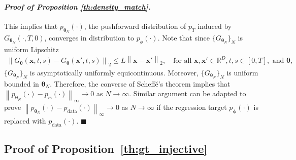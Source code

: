 \documentclass{article} \usepackage{iclr2024_coNFErence,times}
\newcommand{\norm}[1]{\left\lVert#1\right\rVert}
\newenvironment{myproof}[2]{\paragraph{\textit{Proof of {#1} {#2}. }}}{\hfill$\blacksquare$}
\theoremstyle{definition}
\theoremstyle{remark}
\begin{document}
\begin{myproof}{Proposition}{\ref{th:density_match}}
    This implies that $p_{\bm{\theta}_N}(\cdot)$, the pushforward distribution of $p_T$ induced by $G_{\bm{\theta}_N}(\cdot, T, 0)$, converges in distribution to $p_{\phi}(\cdot)$. Note that since $\{G_{\bm{\theta}_N} \}_{N}$ is uniform Lipschitz
    \begin{align*}
        \norm{G_{\bm{\theta}}(\mathbf{x}, t, s) - G_{\bm{\theta}}(\mathbf{x}', t, s)}_2 \leq L \norm{\mathbf{x} - \mathbf{x}'}_2, \quad \text{for all } \mathbf{x}, \mathbf{x}'\in \mathbb{R}^D, t, s\in[0,T], \text{ and } \bm{\theta},
    \end{align*}
    $\{G_{\bm{\theta}_N} \}_{N}$ is asymptotically uniformly equicontinuous.  Moreover, $\{G_{\bm{\theta}_N} \}_{N}$ is uniform bounded in $\bm{\theta}_N$. Therefore, the converse of Scheff\'e's theorem
    \citep{boos1985converse,sweeting1986converse} implies that $\norm{p_{ \bm{\theta}_N}(\cdot)- p_{\bm{\phi}}(\cdot)}_{\infty}\rightarrow 0 $ as $N\rightarrow\infty$. Similar argument can be adapted to prove $\norm{p_{\bm{\theta}_N}(\cdot)- p_{\text{data}}(\cdot)}_{{\infty}}\rightarrow 0$ as $N\rightarrow\infty$ if the regression target $p_{\bm{\phi}}(\cdot)$ is replaced with $p_{ \text{data}}(\cdot)$.
\end{myproof}



\subsection{Proof of Proposition~\ref{th:gt_injective}}
\end{document}
